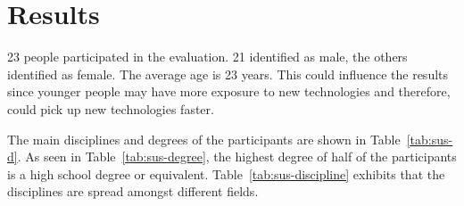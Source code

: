 \section{Results}\label{section:eval-results}


\newcommand{\participantsCount}{23}
\newcommand{\participantsMale}{21}
\newcommand{\participantsAge}{23}

\newcommand{\evalExpMvAvgPoses}{2.83}
\newcommand{\evalExpMvStdPoses}{1.94}
\newcommand{\evalExpMvParticipants}{\participantsCount}

\newcommand{\kammAvgHits}{36.23/60}
\newcommand{\kammAvgStd}{6.87/60}
\newcommand{\youngAvgHits}{0.85}
\newcommand{\youngAvgStd}{-}
\newcommand{\oursAvgHits}{26.13/30}
\newcommand{\oursAvgStd}{5.52/30}

\newcommand{\evalExpMvSusScore}{83.04}
\newcommand{\evalExpMvSusGrade}{B}
\newcommand{\evalExpMvSusAdj}{\enquote{Good}}

\newcommand{\evalExpLpSusScore}{91.41}
\newcommand{\evalExpLpSusGrade}{A}
\newcommand{\evalExpLpSusAdj}{\enquote{Excellent}}

\newcommand{\evalExpVkSusScore}{71.63}
\newcommand{\evalExpVkSusGrade}{C}
\newcommand{\evalExpVkSusAdj}{\enquote{Ok}}

\newcommand{\participantsFemale}{\pgfmathparse{\participantsCount - \participantsMale}\pgfmathprintnumber[fixed, precision=2]{\pgfmathresult}}%


\participantsCount{} people participated in the evaluation. \participantsMale{} identified as male, the others identified as female. The average age is \participantsAge{} years. This could influence the results since younger people may have more exposure to new technologies and therefore, could pick up new technologies faster.

The main disciplines and degrees of the participants are shown in Table~\ref{tab:sus-d}. As seen in Table~\ref{tab:sus-degree}, the highest degree of half of the participants is a high school degree or equivalent.
Table~\ref{tab:sus-discipline} exhibits that the disciplines are spread amongst different fields.


